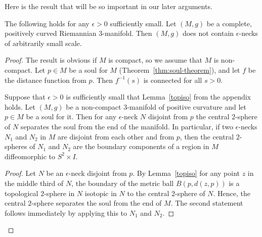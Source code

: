 Here is the result that will be so important in our later arguments.

\begin{proposition}
\label{prop:epsilon-neck-narrow}
\label{narrows}
The following
holds for any $\epsilon>0$ sufficiently small.
Let $(M,g)$ be a complete, positively curved Riemannian
$3$-manifold. Then $(M,g)$ does not contain $\epsilon$-necks of
arbitrarily small scale.
\end{proposition}



\begin{proof}
The result is obvious if $M$ is compact, so we assume that $M$ is
non-compact. Let $p\in M$ be a soul for $M$ (Theorem~\ref{thm:soul-theorem}),
and let $f$ be the distance function from $p$. Then $f^{-1}(s)$ is
connected for all $s>0$.


\begin{lemma}
\label{lem:epsilon-neck-separates}
\label{neckseparate}
Suppose that $\epsilon>0$ is sufficiently small that Lemma~\ref{topiso} from
the appendix holds. Let $(M,g)$ be a non-compact $3$-manifold of positive
curvature and let $p\in M$ be a soul for it. Then for any $\epsilon$-neck $N$
disjoint from $p$
the central $2$-sphere of $N$ separates the soul from the end of the manifold. In particular, if
two $\epsilon$-necks $N_1$ and $N_2$ in $M$ are disjoint from each other and from $p$, then
the central $2$-spheres of $N_1$ and $N_2$ are the boundary
components of a region in $M$ diffeomorphic to $S^2\times I$.
\end{lemma}

\begin{proof}
Let $N$ be an $\epsilon$-neck disjoint from $p$. By
Lemma~\ref{topiso} for any point $z$ in the middle third of $N$, the
boundary of the metric ball $B(p,d(z,p))$ is a topological
$2$-sphere in $N$ isotopic in $N$ to the central $2$-sphere of $N$.
Hence, the central $2$-sphere separates the soul from the end of
$M$. The second statement follows immediately by applying this to
$N_1$ and $N_2$.
\end{proof}


\end{proof}
